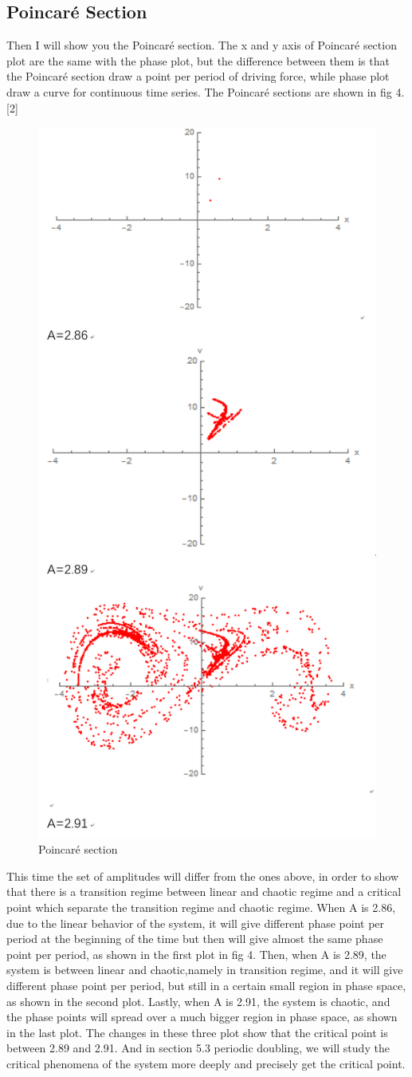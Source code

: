 \documentclass{article}
\begin{document}
\subsection{\textbf{Poincaré Section}}
Then I will show you the Poincaré section. The x and y axis of Poincaré section plot are the same with the phase plot, but the difference between them is that the Poincaré section draw a point per period of driving force, while phase plot draw a curve for continuous time series. The Poincaré sections are shown in fig 4.[2]
\begin{figure}[h]
	\centering
	\includegraphics[width=0.5\linewidth]{plot/poincare}
	\caption{Poincaré section}
	\label{fig:poincare}
\end{figure}

This time the set of amplitudes will differ from the ones above, in order to show that there is a transition regime between linear and chaotic regime and a critical point which separate the transition regime and chaotic regime. When A is 2.86, due to the linear behavior of the system, it will give different phase point per period at the beginning of the time but then will give almost the same phase point per period, as shown in the first plot in fig 4. Then, when A is 2.89, the system is between linear and chaotic,namely in transition regime, and it will give different phase point per period, but still in a certain small region in phase space, as shown in the second plot. Lastly, when A is 2.91, the system is chaotic, and the phase points will spread over a much bigger region in phase space, as shown in the last plot. The changes in these three plot show that the critical point is between 2.89 and 2.91. And in section 5.3 periodic doubling, we will study the critical phenomena of the system more deeply and precisely get the critical point.
\end{document}
